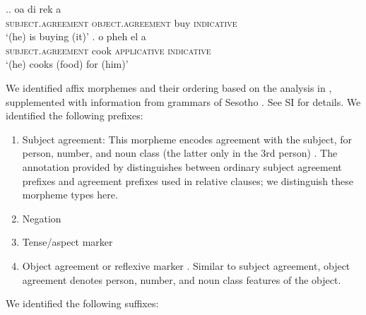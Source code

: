 \ex.\ag. oa di rek a \\
\textsc{subject.agreement} \textsc{object.agreement} buy \textsc{indicative} \\
`(he) is buying (it)'  \cite[ex (41)]{demuth1992acquisition} \label{ex:oadireka}
\bg. o pheh el a \\
\textsc{subject.agreement} cook \textsc{applicative} \textsc{indicative} \\
`(he) cooks (food) for (him)'  \cite[ex (41)]{demuth1992acquisition}
\label{ex:ophehela}

We identified affix morphemes and their ordering based on the analysis in \cite{demuth1992acquisition}, supplemented with information from grammars of Sesotho \citep{doke1967textbook,guma1971outline}. See SI for details.
We identified the following prefixes:

\begin{enumerate}
    \item Subject agreement: This morpheme encodes agreement with the subject, for person, number, and noun class (the latter only in the 3rd person) \cite[]{doke1967textbook}.
	    The annotation provided by \cite{demuth1992acquisition} distinguishes between ordinary subject agreement prefixes and agreement prefixes used in relative clauses; we distinguish these morpheme types here.
    
    \item Negation \cite[]{doke1967textbook}
    
    \item Tense/aspect marker   \cite[--424]{doke1967textbook}
    
    \item Object agreement or reflexive marker \cite[]{doke1967textbook}. 
    Similar to subject agreement, object agreement denotes person, number, and noun class features of the object.
\end{enumerate}
We identified the following suffixes:

    

